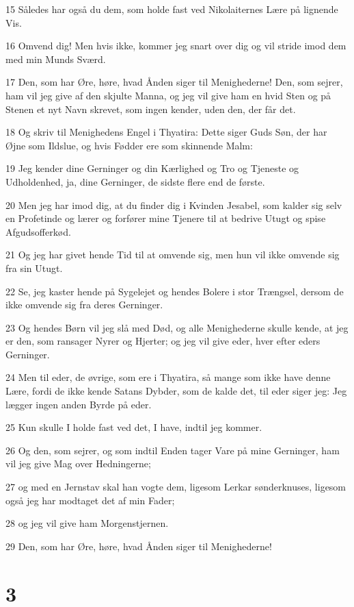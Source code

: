\par 15 Således har også du dem, som holde fast ved Nikolaiternes Lære på lignende Vis.
\par 16 Omvend dig! Men hvis ikke, kommer jeg snart over dig og vil stride imod dem med min Munds Sværd.
\par 17 Den, som har Øre, høre, hvad Ånden siger til Menighederne! Den, som sejrer, ham vil jeg give af den skjulte Manna, og jeg vil give ham en hvid Sten og på Stenen et nyt Navn skrevet, som ingen kender, uden den, der får det.
\par 18 Og skriv til Menighedens Engel i Thyatira: Dette siger Guds Søn, der har Øjne som Ildslue, og hvis Fødder ere som skinnende Malm:
\par 19 Jeg kender dine Gerninger og din Kærlighed og Tro og Tjeneste og Udholdenhed, ja, dine Gerninger, de sidste flere end de første.
\par 20 Men jeg har imod dig, at du finder dig i Kvinden Jesabel, som kalder sig selv en Profetinde og lærer og forfører mine Tjenere til at bedrive Utugt og spise Afgudsofferkød.
\par 21 Og jeg har givet hende Tid til at omvende sig, men hun vil ikke omvende sig fra sin Utugt.
\par 22 Se, jeg kaster hende på Sygelejet og hendes Bolere i stor Trængsel, dersom de ikke omvende sig fra deres Gerninger.
\par 23 Og hendes Børn vil jeg slå med Død, og alle Menighederne skulle kende, at jeg er den, som ransager Nyrer og Hjerter; og jeg vil give eder, hver efter eders Gerninger.
\par 24 Men til eder, de øvrige, som ere i Thyatira, så mange som ikke have denne Lære, fordi de ikke kende Satans Dybder, som de kalde det, til eder siger jeg: Jeg lægger ingen anden Byrde på eder.
\par 25 Kun skulle I holde fast ved det, I have, indtil jeg kommer.
\par 26 Og den, som sejrer, og som indtil Enden tager Vare på mine Gerninger, ham vil jeg give Mag over Hedningerne;
\par 27 og med en Jernstav skal han vogte dem, ligesom Lerkar sønderknuses, ligesom også jeg har modtaget det af min Fader;
\par 28 og jeg vil give ham Morgenstjernen.
\par 29 Den, som har Øre, høre, hvad Ånden siger til Menighederne!

\chapter{3}

